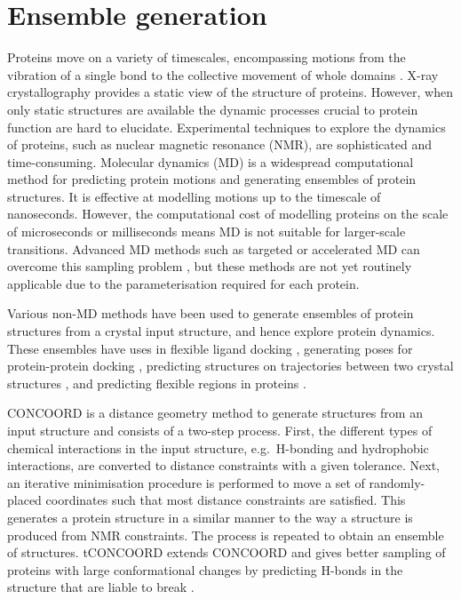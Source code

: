 \section{Ensemble generation}

Proteins move on a variety of timescales, encompassing motions from the vibration of a single bond to the collective movement of whole domains \cite{Henzler-Wildman2007, Wei2016}.
X-ray crystallography provides a static view of the structure of proteins.
However, when only static structures are available the dynamic processes crucial to protein function \cite{Henzler-Wildman2007b} are hard to elucidate.
Experimental techniques to explore the dynamics of proteins, such as nuclear magnetic resonance (NMR), are sophisticated and time-consuming.
Molecular dynamics (MD) is a widespread computational method for predicting protein motions and generating ensembles of protein structures.
It is effective at modelling motions up to the timescale of nanoseconds.
However, the computational cost of modelling proteins on the scale of microseconds or milliseconds means MD is not suitable for larger-scale transitions.
Advanced MD methods such as targeted or accelerated MD can overcome this sampling problem \cite{Maximova2016}, but these methods are not yet routinely applicable due to the parameterisation required for each protein.

Various non-MD methods have been used to generate ensembles of protein structures from a crystal input structure, and hence explore protein dynamics.
These ensembles have uses in flexible ligand docking \cite{Totrov2008}, generating poses for protein-protein docking \cite{Mustard2005}, predicting structures on trajectories between two crystal structures \cite{Weiss2009}, and predicting flexible regions in proteins \cite{Ahmed2011}.

CONCOORD \cite{DeGroot1997, DeGroot1999} is a distance geometry method to generate structures from an input structure and consists of a two-step process.
First, the different types of chemical interactions in the input structure, e.g.\ H-bonding and hydrophobic interactions, are converted to distance constraints with a given tolerance.
Next, an iterative minimisation procedure is performed to move a set of randomly-placed coordinates such that most distance constraints are satisfied.
This generates a protein structure in a similar manner to the way a structure is produced from NMR constraints.
The process is repeated to obtain an ensemble of structures.
tCONCOORD extends CONCOORD and gives better sampling of proteins with large conformational changes by predicting H-bonds in the structure that are liable to break \cite{Seeliger2007}.


